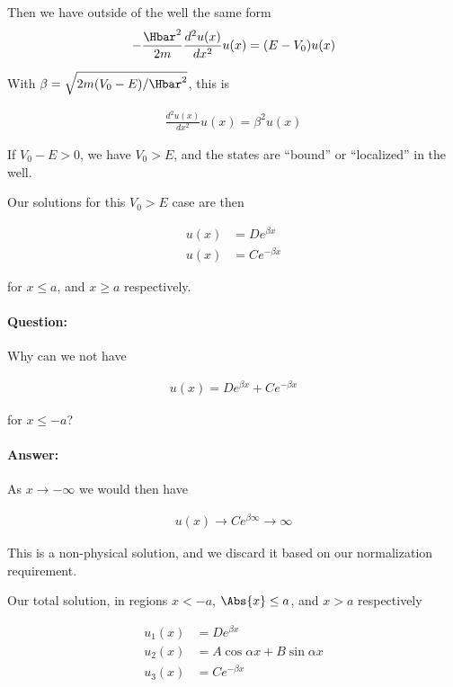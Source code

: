 Then we have outside of the well the same form
\begin{align}\label{eqn:PHY356Lecture9:33}
-\frac{\Hbar^2 }{2m} \frac{d^2 u(x)}{dx^2} u(x) = (E - V_0 )u(x)
\end{align}

With $\beta = \sqrt{ 2m (V_0 - E)/\Hbar^2}$, this is

\begin{align}\label{eqn:PHY356Lecture9:34}
\frac{d^2 u(x)}{dx^2} u(x) = \beta^2 u(x)
\end{align}

If $V_0 - E > 0$, we have $V_0 > E$, and the states are ``bound'' or ``localized'' in the well.

Our solutions for this $V_0 > E$ case are then

\begin{align}\label{eqn:PHY356Lecture9:35}
u(x) &= D e^{\beta x} \\
u(x) &= C e^{-\beta x}
\end{align}

for $x \le a$, and $x \ge a$ respectively.

\paragraph{Question:} Why can we not have

\begin{align}\label{eqn:PHY356Lecture9:36}
u(x) = D e^{\beta x} + C e^{-\beta x}
\end{align}

for $x \le -a$?

\paragraph{Answer:} As $x \rightarrow -\infty$ we would then have

\begin{align*}
u(x) \rightarrow C e^{\beta \infty} \rightarrow \infty
\end{align*}

This is a non-physical solution, and we discard it based on our normalization requirement.

Our total solution, in regions $x < -a$, $\Abs{x} \le a$, and $x > a$ respectively

\begin{align*}
u_1(x) &= D e^{\beta x} \\
u_2(x) &= A \cos\alpha x + B \sin\alpha x \\
u_3(x) &= C e^{-\beta x}
\end{align*}

